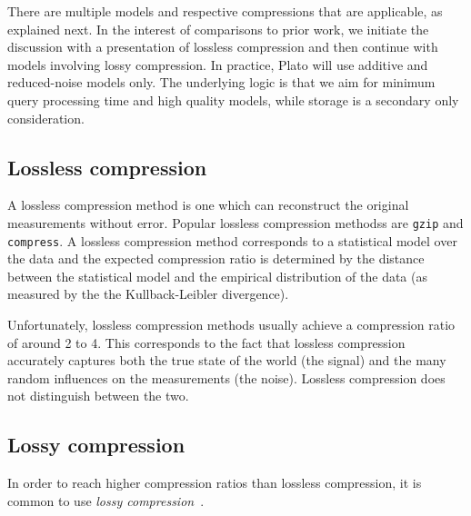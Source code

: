 There are multiple models and respective compressions that are applicable, as explained next. In the interest of comparisons to prior work, we initiate the discussion with a presentation of lossless compression and then continue with models involving lossy compression. In practice, Plato will use additive and reduced-noise models only. The underlying logic is that we aim for minimum query processing time and high quality models, while storage is a secondary only consideration.


\subsection{Lossless compression}
\label{sec:lossless}

A lossless compression method is one which can reconstruct the
original measurements without error. Popular lossless compression
methodss are {\tt gzip} and {\tt compress}. A lossless compression
method corresponds to a statistical model over the data and the
expected compression ratio is determined by the distance between
the statistical model and the empirical distribution of the data (as
measured by the the Kullback-Leibler divergence). 

Unfortunately, lossless compression methods usually achieve a
compression ratio of around 2 to 4. This corresponds to the
fact that lossless compression accurately captures both the true state of the world (the signal)
and the many random influences on the measurements (the noise). 
Lossless compression does not distinguish between the two.

\newcommand{\vx}{\mathbf{x}}
\newcommand{\hx}{\hat{x}}
\newcommand{\vhx}{\hat{\mathbf{x}}}
\newcommand{\vc}{\mathbf{c}}
\newcommand{\vr}{\mathbf{r}}

\subsection{Lossy compression}
In order to reach higher compression ratios than lossless
compression, it is common to use {\em lossy compression}~\cite{CompressionBook}.


